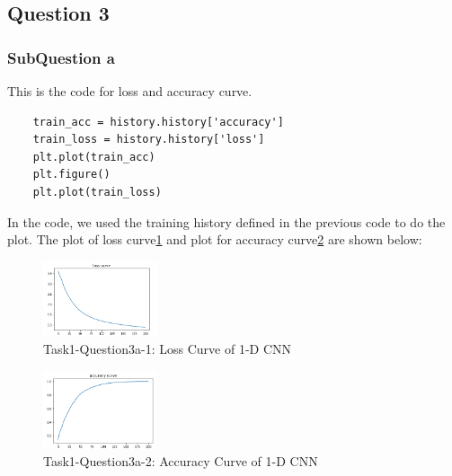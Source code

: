 \documentclass[conference]{IEEEtran}
\begin{document}
\subsection{Question 3}
\subsubsection{SubQuestion a}
This is the code for loss and accuracy curve.
\begin{lstlisting}
    train_acc = history.history['accuracy']
    train_loss = history.history['loss']
    plt.plot(train_acc)
    plt.figure()
    plt.plot(train_loss)
\end{lstlisting}
In the code, we used the training history defined in the previous code to do the plot.
The plot of loss curve\ref{Fig.t1q3a1} and plot for accuracy curve\ref{Fig.t1q3a2} are shown below:
\begin{figure}[H] 
    \centering %
    \includegraphics[width=0.3\textwidth]{T1Q3-b.png} %
    \caption{Task1-Question3a-1: Loss Curve of 1-D CNN} %
    \label{Fig.t1q3a1} %
\end{figure}
\begin{figure}[h] 
    \centering %
    \includegraphics[width=0.3\textwidth]{T1Q3-a.png} %
    \caption{Task1-Question3a-2: Accuracy Curve of 1-D CNN} %
    \label{Fig.t1q3a2} %
\end{figure}
\end{document}
